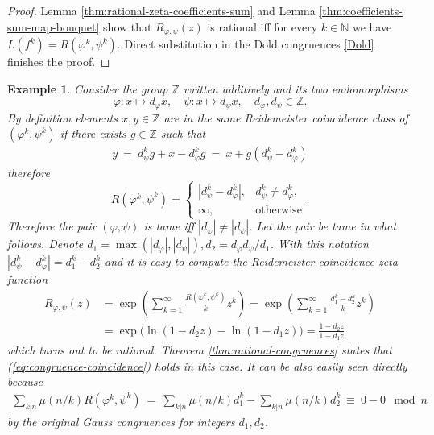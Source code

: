 \documentclass[12pt, a4paper]{amsart}
\def\ln{\operatorname{ln}}
\newtheorem{example}[theorem]{Example}
\def\N{{\mathbb N}}
\begin{document}
\begin{proof}
  Lemma \ref{thm:rational-zeta-coefficients-sum} and Lemma \ref{thm:coefficients-sum-map-bouquet}
  show that $R_{\varphi, \psi}(z)$ is rational iff for every $k \in \N$ we have $L(f^k) = R(\varphi^k, \psi^k)$.
  Direct substitution in the Dold congruences \eqref{Dold} finishes the proof.
\end{proof}

\begin{example}
  Consider the group $\mathbb{Z}$ written additively and its two endomorphisms
  \[
    \varphi: x \mapsto d_\varphi x, \quad \psi: x \mapsto d_\psi x, \quad d_\varphi, d_\psi \in \mathbb{Z}.
  \]
  By definition elements $x,y \in \mathbb{Z}$ are in the same Reidemeister coincidence class
  of $(\varphi^k, \psi^k)$ if there exists $g \in \mathbb{Z}$ such that
  \begin{align*}
    y \ = \ d_\psi^k g + x - d_\varphi^k g \ = \ x + g(d_\psi^k - d_\varphi^k)
  \end{align*}
  therefore
  \begin{equation*}
    R(\varphi^k, \psi^k) = \begin{cases}
      | d_\psi^k - d_\varphi^k |, &d_\psi^k \neq d_\varphi^k,\\
      \infty, &\text{otherwise}
    \end{cases}.
  \end{equation*}
  Therefore the pair $(\varphi, \psi)$ is tame iff $|d_\varphi| \neq |d_\psi|$.
  Let the pair be tame in what follows.
  Denote $d_1 = \max\left( |d_\varphi|, |d_\psi| \right), d_2 = d_\varphi d_\psi / d_1$.
  With this notation $|d_\psi^k - d_\varphi^k| = d_1^k - d_2^k$ and it is easy to compute
  the Reidemeister coincidence zeta function
  \begin{align*}
    R_{\varphi, \psi}(z) &= \exp \left( \sum_{k=1}^\infty \frac{R(\varphi^k, \psi^k)}{k} z^k \right)
    = \exp \left( \sum_{k=1}^\infty \frac{d_1^k - d_2^k}{k} z^k \right) \\
    &= \exp \big( \ln(1-d_2z) - \ln(1-d_1z) \big) = \frac{1-d_2z}{1-d_1z}
  \end{align*}
  which turns out to be rational.
  Theorem \ref{thm:rational-congruences} states that (\ref{eq:congruence-coincidence}) holds in this case.
  It can be also easily seen directly because
  \begin{align*}
    \sum_{k|n} \mu(n/k) R(\varphi^k, \psi^k) \ = \ \sum_{k|n} \mu(n/k) d_1^k - \sum_{k|n} \mu(n/k) d_2^k
    \ \equiv \ 0 - 0 \mod n
  \end{align*}
  by the original Gauss congruences for integers $d_1, d_2$.
\end{example}
\end{document}
